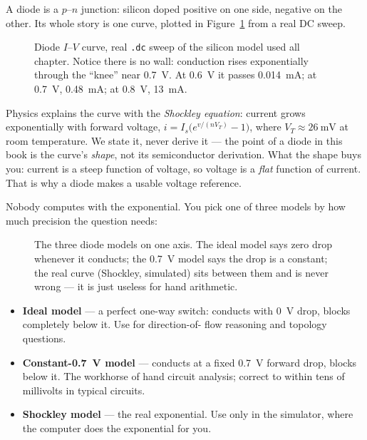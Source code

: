 A diode is a $p$--$n$ junction: silicon doped positive on one side,
negative on the other. Its whole story is one curve, plotted in
Figure~\ref{fig:diode-iv} from a real DC sweep.

\begin{figure}[htbp]
\centering

\caption{Diode $I$--$V$ curve, real \texttt{.dc} sweep of the silicon
model used all chapter. Notice there is no wall: conduction rises
exponentially through the ``knee'' near \qty{0.7}{\volt}. At
\qty{0.6}{\volt} it passes \qty{0.014}{\milli\ampere}; at
\qty{0.7}{\volt}, \qty{0.48}{\milli\ampere}; at \qty{0.8}{\volt},
\qty{13}{\milli\ampere}.}
\label{fig:diode-iv}
\end{figure}

Physics explains the curve with the \emph{Shockley equation}: current
grows exponentially with forward voltage,
$i=I_s\bigl(e^{v/(nV_T)}-1\bigr)$, where $V_T\approx\qty{26}{\milli\volt}$
at room temperature. We state it, never derive it --- the point of a
diode in this book is the curve's \emph{shape}, not its semiconductor
derivation. What the shape buys you: current is a steep function of
voltage, so voltage is a \emph{flat} function of current. That is why a
diode makes a usable voltage reference.

Nobody computes with the exponential. You pick one of three models by
how much precision the question needs:

\begin{figure}[htbp]
\centering

\caption{The three diode models on one axis. The ideal model says zero
drop whenever it conducts; the \qty{0.7}{\volt} model says the drop is a
constant; the real curve (Shockley, simulated) sits between them and is
never wrong --- it is just useless for hand arithmetic.}
\label{fig:diode-models}
\end{figure}

\begin{definition}
\begin{itemize}
\item \textbf{Ideal model} --- a perfect one-way switch: conducts with
\qty{0}{\volt} drop, blocks completely below it. Use for direction-of-
flow reasoning and topology questions.
\item \textbf{Constant-\qty{0.7}{\volt} model} --- conducts at a fixed
\qty{0.7}{\volt} forward drop, blocks below it. The workhorse of hand
circuit analysis; correct to within tens of millivolts in typical
circuits.
\item \textbf{Shockley model} --- the real exponential. Use only in the
simulator, where the computer does the exponential for you.
\end{itemize}
\end{definition}


